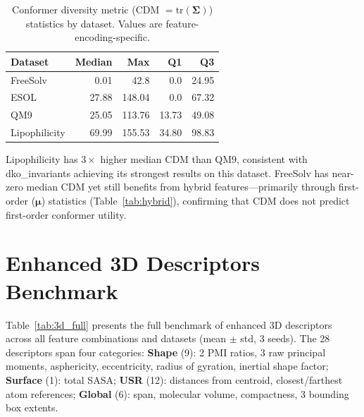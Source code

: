 \documentclass[sigconf]{acmart}
\begin{document}
\begin{table}[ht]
\caption{Conformer diversity metric (CDM $= \mathrm{tr}(\boldsymbol{\Sigma})$) statistics by dataset. Values are feature-encoding-specific.}
\label{tab:cdm}
\centering
\small
\begin{tabular}{@{}lrrrr@{}}
\toprule
Dataset & Median & Max & Q1 & Q3 \\
\midrule
FreeSolv      & 0.01  & 42.8   & 0.0   & 24.95 \\
ESOL          & 27.88 & 148.04 & 0.0   & 67.32 \\
QM9           & 25.05 & 113.76 & 13.73 & 49.08 \\
Lipophilicity & 69.99 & 155.53 & 34.80 & 98.83 \\
\bottomrule
\end{tabular}
\end{table}

Lipophilicity has $3\times$ higher median CDM than QM9, consistent with dko\_invariants achieving its strongest results on this dataset. FreeSolv has near-zero median CDM yet still benefits from hybrid features---primarily through first-order ($\boldsymbol{\mu}$) statistics (Table~\ref{tab:hybrid}), confirming that CDM does not predict first-order conformer utility.

\section{Enhanced 3D Descriptors Benchmark}
\label{app:3d}

Table~\ref{tab:3d_full} presents the full benchmark of enhanced 3D descriptors across all feature combinations and datasets (mean $\pm$ std, 3 seeds). The 28 descriptors span four categories: \textbf{Shape} (9): 2 PMI ratios, 3 raw principal moments, asphericity, eccentricity, radius of gyration, inertial shape factor; \textbf{Surface} (1): total SASA; \textbf{USR} (12): distances from centroid, closest/farthest atom references; \textbf{Global} (6): span, molecular volume, compactness, 3 bounding box extents.
\end{document}
